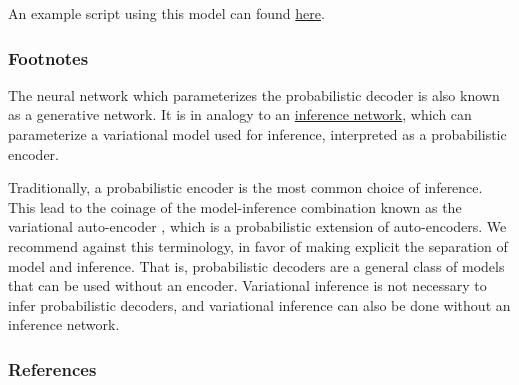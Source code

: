 An example script using this model can found
\href{https://github.com/blei-lab/edward/blob/master/examples/vae.py}
{here}.

\subsubsection{Footnotes}

The neural network which parameterizes the probabilistic decoder is
also known as a generative network. It is in analogy to an
\href{inference-networks}{inference network}, which
can parameterize a variational model used for inference,
interpreted as a probabilistic encoder.

Traditionally, a probabilistic encoder is the most common
choice of inference. This lead to the coinage of the model-inference
combination known as the variational auto-encoder
\citep{kingma2014auto}, which is a probabilistic extension of
auto-encoders.
We recommend against this terminology,
in favor of making explicit the separation of model and inference.
That is, probabilistic decoders are a general class of
models that can be used without an encoder.
Variational
inference is not necessary to infer probabilistic decoders, and
variational inference can also be done without an inference network.

\subsubsection{References}\label{references}

